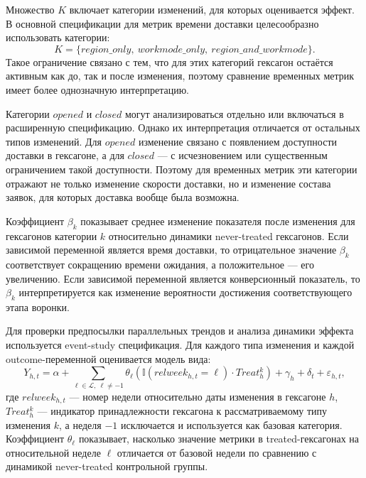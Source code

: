 \documentclass[14pt,a4paper]{extarticle}
\begin{document}
Множество \(K\) включает категории изменений, для которых оценивается эффект. В основной спецификации для метрик времени доставки целесообразно использовать категории:
\[
K =
\{
region\_only,\ workmode\_only,\ region\_and\_workmode
\}.
\]
Такое ограничение связано с тем, что для этих категорий гексагон остаётся активным как до, так и после изменения, поэтому сравнение временных метрик имеет более однозначную интерпретацию.

Категории \(opened\) и \(closed\) могут анализироваться отдельно или включаться в расширенную спецификацию. Однако их интерпретация отличается от остальных типов изменений. Для \(opened\) изменение связано с появлением доступности доставки в гексагоне, а для \(closed\) --- с исчезновением или существенным ограничением такой доступности. Поэтому для временных метрик эти категории отражают не только изменение скорости доставки, но и изменение состава заявок, для которых доставка вообще была возможна.

Коэффициент \(\beta_k\) показывает среднее изменение показателя после изменения для гексагонов категории \(k\) относительно динамики never-treated гексагонов. Если зависимой переменной является время доставки, то отрицательное значение \(\beta_k\) соответствует сокращению времени ожидания, а положительное --- его увеличению. Если зависимой переменной является конверсионный показатель, то \(\beta_k\) интерпретируется как изменение вероятности достижения соответствующего этапа воронки.

Для проверки предпосылки параллельных трендов и анализа динамики эффекта используется event-study спецификация. Для каждого типа изменения и каждой outcome-переменной оценивается модель вида:
\[
Y_{h,t}
=
\alpha
+
\sum_{\ell \in \mathcal{L},\ \ell \neq -1}
\theta_{\ell}
\left(
\mathbb{I}(relweek_{h,t}=\ell) \cdot Treat^{k}_{h}
\right)
+
\gamma_h
+
\delta_t
+
\varepsilon_{h,t},
\]
где \(relweek_{h,t}\) --- номер недели относительно даты изменения в гексагоне \(h\), \(Treat^{k}_{h}\) --- индикатор принадлежности гексагона к рассматриваемому типу изменения \(k\), а неделя \(-1\) исключается и используется как базовая категория. Коэффициент \(\theta_{\ell}\) показывает, насколько значение метрики в treated-гексагонах на относительной неделе \(\ell\) отличается от базовой недели по сравнению с динамикой never-treated контрольной группы.
\end{document}
